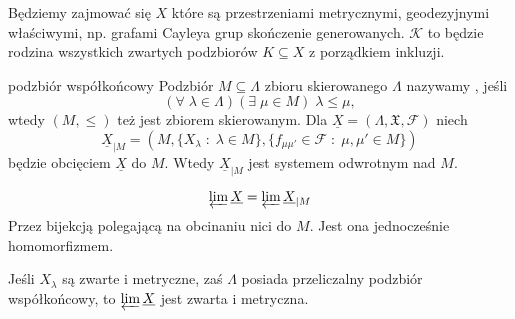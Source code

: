 Będziemy zajmować się $X$ które są przestrzeniami metrycznymi, geodezyjnymi właściwymi, np. grafami Cayleya grup skończenie generowanych. $\mathcal{K}$ to będzie rodzina wszystkich zwartych podzbiorów $K\subseteq X$ z porządkiem inkluzji.

\begin{definition}{podzbiór współkońcowy}{}
  Podzbiór $M\subseteq\Lambda$ zbioru skierowanego $\Lambda$ nazywamy , jeśli 
  $$(\forall\;\lambda\in\Lambda)(\exists\;\mu\in M)\;\lambda\leq\mu,$$ 
  wtedy $(M, \leq)$ też jest zbiorem skierowanym. Dla $\underline{X}=(\Lambda, \mathfrak{X}, \mathcal{F})$ niech 
  $$\underline{X}_{|M}=(M, \{X_\lambda\;:\;\lambda\in M\}, \{f_{\mu\mu'}\in\mathcal{F}\;:\;\mu,\mu'\in M\})$$
  będzie obcięciem $\underline{X}$ do $M$. Wtedy $\underline{X}_{|M}$ jest systemem odwrotnym nad $M$.
\end{definition}

\begin{fact}{}{}
  $$\varprojlim\underline{X}=\varprojlim\underline{X}_{|M}$$
  Przez bijekcją polegającą na obcinaniu nici do $M$. Jest ona jednocześnie homomorfizmem.
\end{fact}

\begin{conclusion}{}{} 
  Jeśli $X_\lambda$ są zwarte i metryczne, zaś $\Lambda$ posiada przeliczalny podzbiór współkońcowy, to $\varprojlim\underline{X}$ jest zwarta i metryczna.
\end{conclusion}

